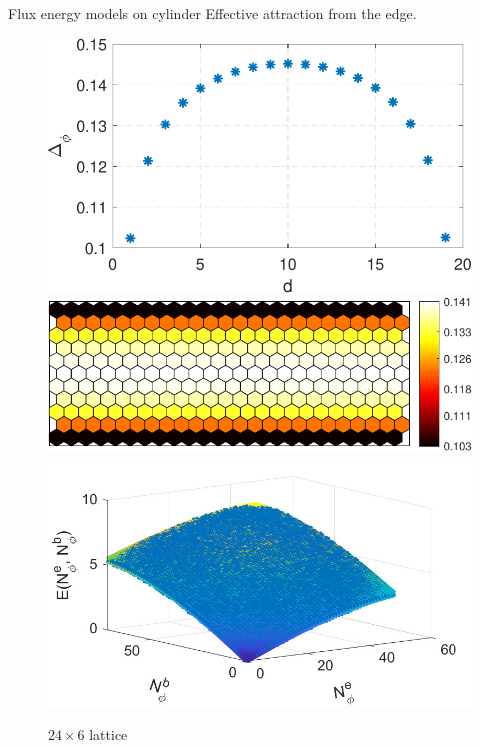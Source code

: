 \begin{frame}{Flux energy models on cylinder}
    \small
    Effective attraction from the edge.
    \begin{figure}
        \centering
        \begin{minipage}[c]{.4\textwidth}
            \includegraphics[width = 1\textwidth]{figures/flux_potential_dy_40_20.pdf}
        \end{minipage}
        \hspace{0.3cm}
        \begin{minipage}[c]{.4\textwidth}
            \includegraphics[width = 1\textwidth]{figures/one_flux.pdf}
        \end{minipage}

        \begin{minipage}[t]{.4\textwidth}
            \includegraphics[width = 1\textwidth]{figures/cyl_cir_24_wid_6.pdf}
        \end{minipage}
        \begin{minipage}[t]{.15\textwidth}
            \footnotesize $24\times 6$ lattice
        \end{minipage}
    \end{figure}
    

\end{frame}
